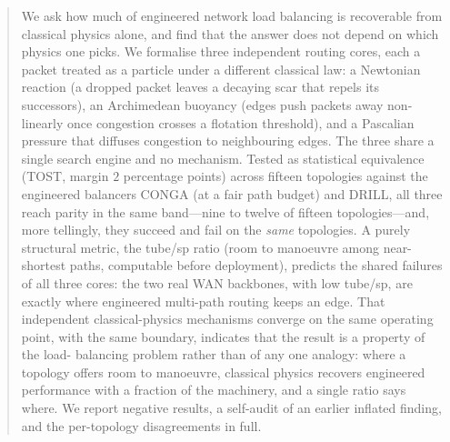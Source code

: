 \begin{abstract}
We ask how much of engineered network load balancing is recoverable from
classical physics alone, and find that the answer does not depend on which
physics one picks. We formalise three independent routing cores, each a packet
treated as a particle under a different classical law: a Newtonian
reaction (a dropped packet leaves a decaying scar that repels its successors),
an Archimedean buoyancy (edges push packets away non-linearly once congestion
crosses a flotation threshold), and a Pascalian pressure that diffuses
congestion to neighbouring edges. The three share a single search engine and no
mechanism. Tested as statistical equivalence (TOST, margin $2$ percentage
points) across fifteen topologies against the engineered balancers CONGA (at a
fair path budget) and DRILL, all three reach parity in the same band---nine to
twelve of fifteen topologies---and, more tellingly, they succeed and fail on the
\emph{same} topologies. A purely structural metric, the tube/sp ratio (room to
manoeuvre among near-shortest paths, computable before deployment), predicts the
shared failures of all three cores: the two real WAN backbones, with low
tube/sp, are exactly where engineered multi-path routing keeps an edge. That
independent classical-physics mechanisms converge on the same operating point,
with the same boundary, indicates that the result is a property of the load-
balancing problem rather than of any one analogy: where a topology offers room
to manoeuvre, classical physics recovers engineered performance with a fraction
of the machinery, and a single ratio says where. We report negative results, a
self-audit of an earlier inflated finding, and the per-topology disagreements in
full.
\end{abstract}
